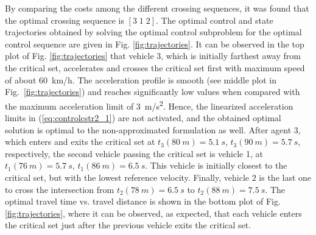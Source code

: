 \documentclass[letterpaper,10pt,conference]{ieeeconf}
\begin{document}
By comparing the costs among the different crossing sequences, it was found that the optimal crossing sequence is \mbox{$[3 \; 1 \; 2]$}. The optimal control and state trajectories obtained by solving the optimal control subproblem for the optimal control sequence are given in Fig. \ref{fig:trajectories}. It can be observed in the top plot of Fig. \ref{fig:trajectories} that vehicle 3, which is initially farthest away from the critical set, accelerates and crosses the critical set first with maximum speed of about \SI{60}{km/h}. The acceleration profile is smooth (see middle plot in Fig.~\ref{fig:trajectories}) and reaches significantly low values when compared with the maximum acceleration limit of \SI{3}{m/s^2}. Hence, the linearized acceleration limits in (\ref{eq:controlcstr2_1}) are not activated, and the obtained optimal solution is optimal to the non-approximated formulation as well. After agent $3$, which enters and exits the critical set at $t_3(\SI{80}{m})=\SI{5.1}{s}$, $t_3(\SI{90}{m})=\SI{5.7}{s}$, respectively, the second vehicle passing the critical set is vehicle 1, at $t_1(\SI{76}{m})=\SI{5.7}{s}$, $t_1(\SI{86}{m})=\SI{6.5}{s}$. This vehicle is initially closest to the critical set, but with the lowest reference velocity. Finally, vehicle $2$ is the last one to cross the intersection from $t_2(\SI{78}{m})=\SI{6.5}{s}$ to $t_2(\SI{88}{m})=\SI{7.5}{s}$. The optimal travel time vs. travel distance is shown in the bottom plot of Fig. \ref{fig:trajectories}, where it can be observed, as expected, that each vehicle enters the critical set just after the previous vehicle exits the critical set.
\end{document}
